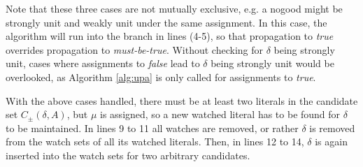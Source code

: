 \documentclass[final]{vutinfth} %
\newcommand{\mbt}{must-be-true\xspace}
\newcommand{\bT}{\mathbf{T}}
\newcommand{\cdpm}{C_\pm}
\newcommand{\sgl}{\mu}
\begin{document}
Note that these three cases are not mutually exclusive, e.g. a nogood might be strongly unit and weakly unit under the same assignment. In this case, the algorithm will run into the branch in lines (4-5), so that propagation to \emph{true} overrides propagation to \emph{\mbt}. Without checking for $\delta$ being strongly unit, cases where assignments to \emph{false} lead to $\delta$ being strongly unit would be overlooked, as Algorithm \ref{alg:upa} is only called for assignments to \emph{true}.

With the above cases handled, there must be at least two literals in the candidate set $\cdpm(\delta, A)$, but $\sgl$ is assigned, so a new watched literal has to be found for $\delta$ to be maintained. In lines 9 to 11 all watches are removed, or rather $\delta$ is removed from the watch sets of all its watched literals. Then, in lines 12 to 14, $\delta$ is again inserted into the watch sets for two arbitrary candidates.
 

\end{document}
